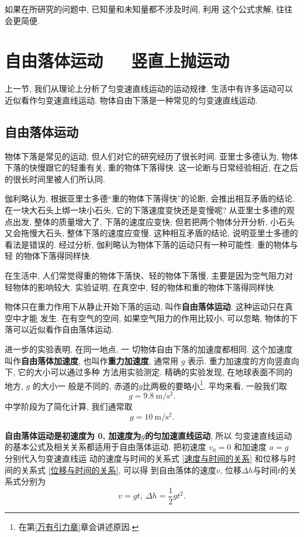 \documentclass[11pt,a4paper]{ctexbook}
\newcommand{\bre}{\ \ \ }
\newcommand{\unit}[1]{\ \mathrm{#1}}
\begin{document}
如果在所研究的问题中, 已知量和未知量都不涉及时间, 利用
这个公式求解, 往往会更简便.


\section{自由落体运动\bre 竖直上抛运动}

上一节, 我们从理论上分析了匀变速直线运动的运动规律. 生活中有许多运动可以近似看作匀变速直线运动.
物体自由下落是一种常见的匀变速直线运动.

\subsection{自由落体运动}

物体下落是常见的运动, 但人们对它的研究经历了很长时间.
亚里士多德认为, 物体下落的快慢跟它的轻重有关, 重的物体下落得快. 这一论断与日常经验相近,
在之后的很长时间里被人们所认同.

伽利略认为, 根据亚里士多德``重的物体下落得快''的论断,
会推出相互矛盾的结论. 在一块大石头上绑一块小石头, 它的下落速度变快还是变慢呢?
从亚里士多德的观点出发, 整体的质量增大了, 下落的速度应变快; 但若把两个物体分开分析, 小石头又会拖慢大石头,
整体下落的速度应变慢. 这种相互矛盾的结论, 说明亚里士多德的看法是错误的.
经过分析, 伽利略认为物体下落的运动只有一种可能性: 重的物体与轻
的物体下落得同样快.

在生活中, 人们常觉得重的物体下落快、轻的物体下落慢, 主要是因为空气阻力对轻物体的影响较大.
实验证明, 在真空中, 轻的物体和重的物体下落得同样快.

物体只在重力作用下从静止开始下落的运动, 叫作\textbf{自由落体运动}. 这种运动只在真空中才能
发生. 在有空气的空间, 如果空气阻力的作用比较小, 可以忽略, 物体的下落可以近似看作自由落体运动.

进一步的实验表明, 在同一地点, 一
切物体自由下落的加速度都相同. 这个加速度叫作\textbf{自由落体加速度}, 也叫作\textbf{重力加速度},
通常用 $g$ 表示. 重力加速度的方向竖直向下, 它的大小可以通过多种
方法用实验测定. 精确的实验发现, 在地球表面不同的地方, $g$ 的大小一
般是不同的, 赤道的$g$比两极的要略小\footnote{在第\ref{万有引力章}章会讲述原因.}.
平均来看, 一般我们取$$g = 9.8\unit{m/s^2}.$$ 中学阶段为了简化计算, 我们通常取$$g = 10\unit{m/s^2}.$$

\textbf{自由落体运动是初速度为 0, 加速度为$g$的匀加速直线运动}, 所以
匀变速直线运动的基本公式及相关关系都适用于自由落体运动.
把初速度 $v_0 = 0$ 和加速度 $a = g$ 分别代入匀变速直线运
动的速度与时间的关系式 \eqref{速度与时间的关系} 和位移与时间的关系式 \eqref{位移与时间的关系}, 可以得
到自由落体的速度$v$, 位移$\Delta h$与时间$t$的关系式分别为
$$v = gt,\ \Delta h = \frac12gt^2.$$
\end{document}
